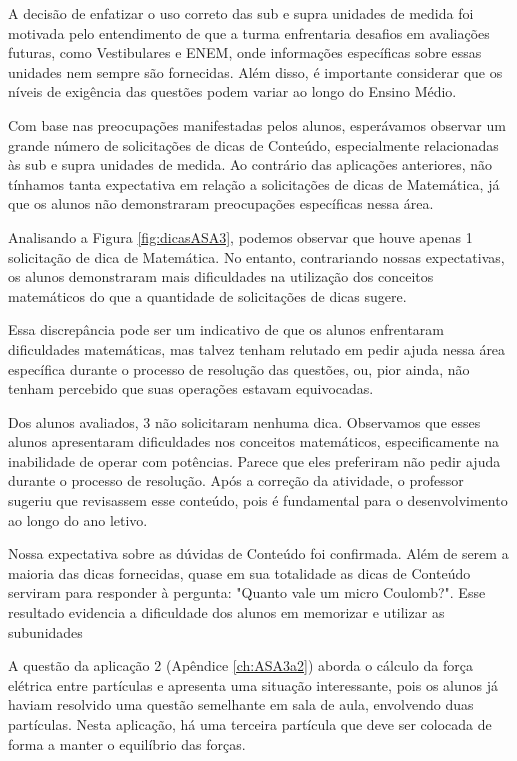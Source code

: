 A decisão de enfatizar o uso correto das sub e supra unidades de medida foi motivada pelo entendimento de que a turma enfrentaria desafios em avaliações futuras, como Vestibulares e ENEM, onde informações específicas sobre essas unidades nem sempre são fornecidas. Além disso, é importante considerar que os níveis de exigência das questões podem variar ao longo do Ensino Médio.

Com base nas preocupações manifestadas pelos alunos, esperávamos observar um grande número de solicitações de dicas de Conteúdo, especialmente relacionadas às sub e supra unidades de medida. Ao contrário das aplicações anteriores, não tínhamos tanta expectativa em relação a solicitações de dicas de Matemática, já que os alunos não demonstraram preocupações específicas nessa área.

Analisando a Figura \ref{fig:dicasASA3}, podemos observar que houve apenas 1 solicitação de dica de Matemática. No entanto, contrariando nossas expectativas, os alunos demonstraram mais dificuldades na utilização dos conceitos matemáticos do que a quantidade de solicitações de dicas sugere. 

Essa discrepância pode ser um indicativo de que os alunos enfrentaram dificuldades matemáticas, mas talvez tenham relutado em pedir ajuda nessa área específica durante o processo de resolução das questões, ou, pior ainda, não tenham percebido que suas operações estavam equivocadas.

Dos alunos avaliados, 3 não solicitaram nenhuma dica. Observamos que esses alunos apresentaram dificuldades nos conceitos matemáticos, especificamente na inabilidade de operar com potências. Parece que eles preferiram não pedir ajuda durante o processo de resolução. Após a correção da atividade, o professor sugeriu que revisassem esse conteúdo, pois é fundamental para o desenvolvimento ao longo do ano letivo.

Nossa expectativa sobre as dúvidas de Conteúdo foi confirmada. Além de serem a maioria das dicas fornecidas, quase em sua totalidade as dicas de Conteúdo serviram para responder à pergunta: "Quanto vale um micro Coulomb?". Esse resultado evidencia a dificuldade dos alunos em memorizar e utilizar as subunidades

A questão da aplicação 2 (Apêndice \ref{ch:ASA3a2}) aborda o cálculo da força elétrica entre partículas e apresenta uma situação interessante, pois os alunos já haviam resolvido uma questão semelhante em sala de aula, envolvendo duas partículas. Nesta aplicação, há uma terceira partícula que deve ser colocada de forma a manter o equilíbrio das forças.

